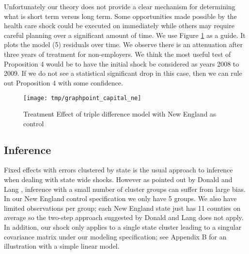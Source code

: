 \documentclass[12pt]{article}
\begin{document}
Unfortunately our theory does not provide a clear mechanism for determining what is short term versus long term. Some opportunities made possible by the health care shock could be executed on immediately while others may require careful planning over a significant amount of time. We use Figure \ref{fig:ddd} as a guide. It plots the model (5) residuals over time. We observe there is an attenuation after three years of treatment for non-employers. We think the most useful test of Proposition 4 would be to have the initial shock be considered as years 2008 to 2009. If we do not see a statistical significant drop in this case, then we can rule out Proposition 4 with some confidence. 

\begin{figure}[H]
	\centering
	\texttt{[image: tmp/graphpoint\_capital\_ne]}
	\caption{Treatment Effect of triple difference model with New England as control}
	\label{fig:ddd}
\end{figure}

\begin{comment}
\begin{figure}[H]
	\centering
	\begin{subfigure}[b]{0.495\textwidth}
		\texttt{[image: resources/graphpoint\_diff\_ne\_pop\_ddd\_synth]}
		\caption{Non-Employers}
	\end{subfigure}
		\begin{subfigure}[b]{0.495\textwidth}
		\texttt{[image: resources/graphpoint\_diff\_em\_pop\_ddd\_synth]}
		\caption{Small businesses}
	\end{subfigure}
	\caption{Treatment Effect of triple difference model with synthetic control}
\end{figure}
\end{comment}

\subsection{Inference}

Fixed effects with errors clustered by state is the usual approach to inference when dealing with state wide shocks. However as pointed out by Donald and Lang \cite{donald}, inference with a small number of cluster groups can suffer from large bias. In our New England control specification we only have 5 groups. We also have limited observations per group; each New England state just has 11 counties on average so the two-step approach suggested by Donald and Lang does not apply. In addition, our shock only applies to a single state cluster leading to a singular covariance matrix under our modeling specification; see Appendix B for an illustration with a simple linear model. 
\end{document}
